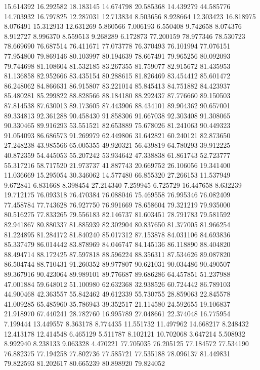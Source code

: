 15.614392
16.292582
18.183145
14.674798
20.585368
14.439279
44.585776
14.703932
16.797825
12.287031
12.713834
8.503656
8.928664
12.303423
16.818975
8.076491
15.312913
12.631269
5.860566
7.006193
6.550408
9.742658
8.074376
8.912727
8.996370
8.559513
9.268289
6.172873
77.200159
78.977346
78.530723
78.669690
76.687514
76.411671
77.073778
76.370493
76.101994
77.076151
77.954800
79.869146
80.103997
80.194639
78.667491
79.965256
80.092093
79.744698
81.108604
81.532185
83.267355
81.759077
82.915672
81.435953
81.136858
82.952666
83.435154
80.288615
81.826469
83.454412
85.601472
86.248062
84.866631
86.915807
83.221014
85.845413
84.751882
84.423937
85.480281
85.299822
88.828566
88.184180
88.292437
87.776660
89.150503
87.814538
87.630013
89.173605
87.443906
88.434101
89.904362
90.657001
89.334813
92.361288
90.458430
91.858306
91.667038
92.303408
91.308065
90.330465
89.916293
53.551521
82.653889
75.678026
81.241063
90.449323
91.054093
86.686573
91.269979
62.449806
31.642821
60.240121
82.873650
27.248238
43.985566
65.005355
49.920321
56.439819
64.780293
39.912225
40.872359
54.445053
55.207242
53.934642
47.338838
61.861743
52.723777
55.317216
58.717520
21.973737
41.887743
20.669752
26.106056
19.341400
11.036669
15.295054
30.346062
14.577480
66.855320
27.266153
11.537949
9.672841
6.831668
8.398454
27.214340
7.259945
6.725729
16.447658
8.632239
19.712175
76.093318
76.470384
76.088046
75.469558
76.995346
76.082409
77.458784
77.743628
76.927750
76.991669
78.658604
79.321219
79.935000
80.516275
77.833265
79.556183
82.146737
81.603451
78.791783
79.581592
82.941867
80.880337
81.885939
82.302904
80.837650
81.377005
81.966254
81.224895
81.284172
81.840240
85.017312
87.153878
84.031106
84.693836
85.337479
86.014442
83.878969
84.046747
84.145136
86.118890
88.404820
88.494714
88.172425
87.597818
88.596224
88.356311
87.534626
89.087820
86.504744
88.710431
91.260352
89.977807
90.621031
90.034486
90.490507
89.367916
90.423064
89.989101
89.776687
89.686286
64.457851
51.237988
47.001884
59.648012
51.100980
62.632368
32.938526
60.724442
86.789103
44.900468
42.363557
55.842462
49.612339
55.730755
28.859063
22.845578
41.009285
65.485960
35.786943
39.352517
21.114580
24.592655
19.106837
21.918970
67.440241
28.782760
16.995789
27.048661
22.374048
16.775954
7.199444
13.449557
8.363178
8.774435
11.551732
11.497962
14.668217
8.248432
12.413178
12.414548
6.465129
5.511787
8.102121
10.702068
3.647214
5.508932
8.992940
8.238133
9.063328
4.470221
77.705035
76.205125
77.184572
77.534190
76.882375
77.194258
77.802736
77.585721
77.535188
78.096137
81.449831
79.822593
81.202617
80.665239
80.898920
79.824052
